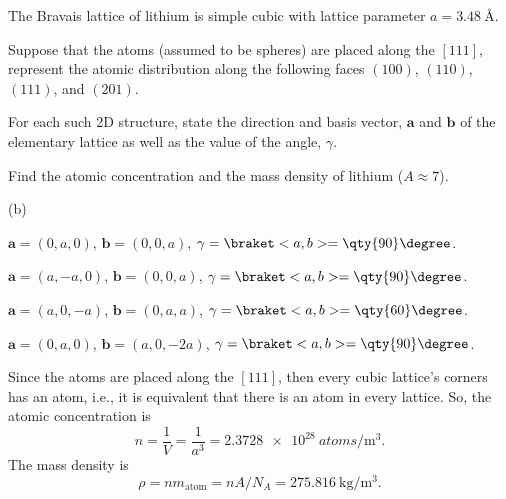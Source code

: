 \begin{problem}
  The Bravais lattice of lithium is simple cubic with lattice parameter
  $a = \qty{3.48}\angstrom$.
  \begin{enumext}
    \item Suppose that the atoms (assumed to be spheres) are placed along the
    $[111]$, represent the atomic distribution along the following faces
    $(100)$, $(110)$, $(111)$, and $(201)$.
    \item For each such 2D structure, state the direction and basis vector,
    $\bm a$ and $\bm b$ of the elementary lattice as well as the value of the
    angle, $\gamma$.
    \item Find the atomic concentration and the mass density of lithium
    ($A \approx 7$).
  \end{enumext}
\end{problem}
\begin{solution}\leavevmode
  \begin{enumext}
    \item (b)
    \begin{enumext}
      \item [$(100)$] $\bm a = (0,a,0)$, $\bm b = (0,0,a)$,
      $\gamma = \braket<a,b> = \qty{90}\degree$.
      \item [$(110)$] $\bm a = (a,-a,0)$, $\bm b = (0,0,a)$,
      $\gamma = \braket<a,b> = \qty{90}\degree$.
      \item [$(111)$] $\bm a = (a,0,-a)$, $\bm b = (0,a,a)$,
      $\gamma = \braket<a,b> = \qty{60}\degree$.
      \item [$(201)$] $\bm a = (0,a,0)$, $\bm b = (a,0,-2a)$,
      $\gamma = \braket<a,b> = \qty{90}\degree$.
    \end{enumext}
    \addtocounter{enumXi}{1}
    \item Since the atoms are placed along the $[111]$, then every cubic
    lattice's corners has an atom, i.e., it is equivalent that there is an
    atom in every lattice. So, the atomic concentration is
    \[
      n = \frac1V = \frac1{a^3} = \qty{2.3728e28}{atoms/\m^3}.
    \]
    The mass density is
    \[
      \rho = n m_\text{atom} = nA/N_A = \qty{275.816}{\kg/\m^3}.
    \]
  \end{enumext}
\end{solution}